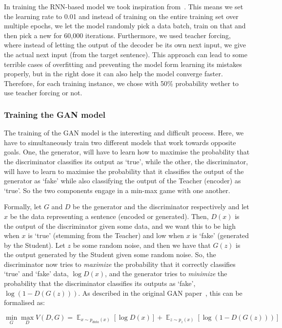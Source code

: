 \documentclass{article}
\DeclareMathOperator*{\E}{\mathbb{E}}
\begin{document}
In training the RNN-based model we took inspiration
from~\cite{pytorchTutorialAtt}. This means we set the learning rate to 0.01 and
instead of training on the entire training set over multiple epochs, we let the
model randomly pick a data batch, train on that and then pick a new for 60,000
iterations. Furthermore, we used teacher forcing, where instead of letting the
output of the decoder be its own next input, we give the actual next input (from
the target sentence). This approach can lead to some terrible cases of
overfitting and preventing the model form learning its mistakes properly, but in
the right dose it can also help the model converge faster. Therefore, for each
training instance, we chose with 50\% probability wether to use teacher forcing
or not.


\subsubsection{Training the GAN model}

The training of the GAN model is the interesting and difficult process. Here, we
have to simultaneously train two different models that work towards opposite
goals. One, the generator, will have to learn how to maximise the probability
that the discriminator classifies its output as `true', while the other, the
discriminator, will have to learn to maximise the probability that it classifies
the output of the generator as `fake' while also classifying the output of the
Teacher (encoder) as `true'. So the two components engage in a min-max game
with one another.

Formally, let $G$ and $D$ be the generator and the discriminator respectively
and let $x$ be the data representing a sentence (encoded or generated). Then,
$D(x)$ is the output of the discriminator given some data, and we want this to
be high when $x$ is `true' (stemming from the Teacher) and low when $x$ is
`fake' (generated by the Student). Let $z$ be some random noise, and then we
have that $G(z)$ is the output generated by the Student given some random noise.
So, the discriminator now tries to \textit{maximize} the probability that it
correctly classifies `true' and `fake' data, $\log D(x)$, and the generator
tries to \textit{minimize} the probability that the discriminator classifies its
outputs as `fake', $\log(1 - D(G(z)))$. As described in the original GAN
paper~\cite{Goodfellow2014GenerativeAN}, this can be formalised as:

\[
    \min_G \max_D V(D,G) = {\E}_{x \sim p_{data}(x)}\left[\log D(x)\right] +
        {\E}_{z \sim p_{z}(x)}\left[\log(1 - D(G(z)))\right]
\] 
\end{document}

